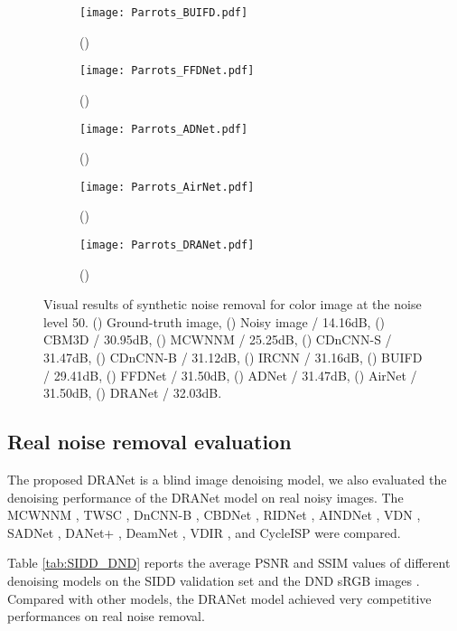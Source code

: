\documentclass[3p,times]{elsarticle}
\begin{document}
\begin{figure*}[htbp]
\begin{subfigure}{0.225\linewidth}
		\centering
		\texttt{[image: Parrots\_BUIFD.pdf]}
		\caption{()}
	\end{subfigure}
    \centering
	\begin{subfigure}{0.225\linewidth}
		\centering
		\texttt{[image: Parrots\_FFDNet.pdf]}
		\caption{()}
	\end{subfigure}
    \centering
	\begin{subfigure}{0.225\linewidth}
		\centering
		\texttt{[image: Parrots\_ADNet.pdf]}
		\caption{()}
	\end{subfigure}
    \centering
	\begin{subfigure}{0.225\linewidth}
		\centering
		\texttt{[image: Parrots\_AirNet.pdf]}
		\caption{()}
	\end{subfigure}
    \centering
	\begin{subfigure}{0.225\linewidth}
		\centering
		\texttt{[image: Parrots\_DRANet.pdf]}
		\caption{(\uppercase\expandafter{})}
	\end{subfigure}
\caption{Visual results of synthetic noise removal for color image at the noise level 50. () Ground-truth image, () Noisy image / 14.16dB, () CBM3D / 30.95dB, () MCWNNM / 25.25dB, () CDnCNN-S / 31.47dB, () CDnCNN-B / 31.12dB, () IRCNN / 31.16dB, () BUIFD / 29.41dB, () FFDNet / 31.50dB, () ADNet / 31.47dB, () AirNet / 31.50dB, () DRANet / 32.03dB.}
\label{fig:kodim23}
\end{figure*}

\subsection{Real noise removal evaluation}
The proposed DRANet is a blind image denoising model, we also evaluated the denoising performance of the DRANet model on real noisy images. The MCWNNM \cite{Xu2017}, TWSC \cite{Xu2018}, DnCNN-B \cite{Zhang2017}, CBDNet \cite{Guo2019}, RIDNet \cite{Anwar2019}, AINDNet \cite{Kim2020}, VDN \cite{Yue2019}, SADNet \cite{Chang2020}, DANet+ \cite{Yue2020}, DeamNet \cite{Ren2021}, VDIR \cite{Soh2022}, and CycleISP \cite{Zamir2020} were compared.

Table \ref{tab:SIDD_DND} reports the average PSNR and SSIM values of different denoising models on the SIDD validation set \cite{Abdelhamed2018} and the DND sRGB images \cite{Plotz2017}. Compared with other models, the DRANet model achieved very competitive performances on real noise removal.
\end{document}
